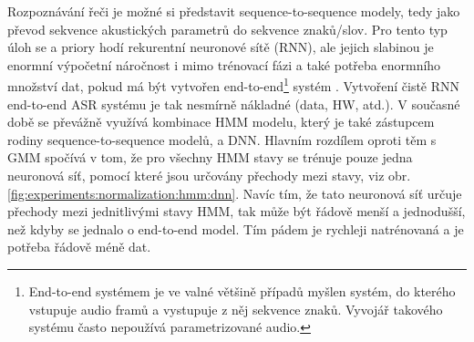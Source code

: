 Rozpoznávání řeči je možné si představit sequence-to-sequence modely, tedy jako převod sekvence akustických parametrů do sekvence znaků/slov. Pro tento typ úloh se a priory hodí rekurentní neuronové sítě (RNN), ale jejich slabinou je enormní výpočetní náročnost i mimo trénovací fázi a také potřeba enormního množství dat, pokud má být vytvořen end-to-end\footnote{End-to-end systémem je ve valné většině případů myšlen systém, do kterého vstupuje audio framů a  vystupuje z něj sekvence znaků. Vyvojář takového systému často nepoužívá parametrizované audio.} systém \cite{Hannun2014}. Vytvoření čistě RNN end-to-end ASR systému je tak nesmírně nákladné (data, HW, atd.). V současné době se převážně využívá kombinace HMM modelu, který je také zástupcem rodiny sequence-to-sequence modelů, a DNN. Hlavním rozdílem oproti těm s GMM spočívá v tom, že pro všechny HMM stavy se trénuje pouze jedna neuronová síť, pomocí které jsou určovány přechody mezi stavy, viz obr. \ref{fig:experiments:normalization:hmm:dnn}. Navíc tím, že tato neuronová síť určuje  přechody mezi jednitlivými stavy HMM, tak může být řádově menší a jednodušší, než kdyby se jednalo o end-to-end model. Tím pádem je rychleji natrénovaná a je potřeba řádově méně dat.


